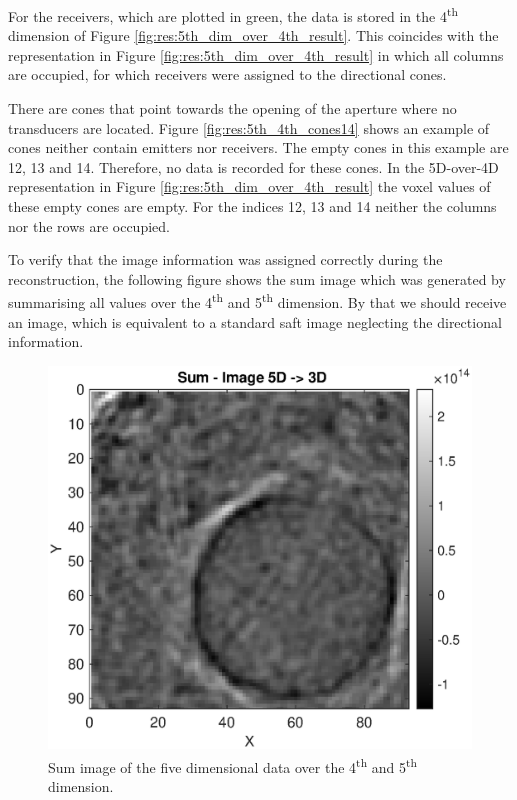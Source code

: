 For the receivers, which are plotted in green, the data is stored in the 4\textsuperscript{th} dimension of Figure \ref{fig:res:5th_dim_over_4th_result}. This coincides with the representation in Figure \ref{fig:res:5th_dim_over_4th_result} in which all columns are occupied, for which receivers were assigned to the directional cones. 

There are cones that point towards the opening of the aperture where no transducers are located. Figure \ref{fig:res:5th_4th_cones14} shows an example of cones neither contain emitters nor receivers. The empty cones in this example are 12, 13 and 14. Therefore, no data is recorded for these cones. In the 5D-over-4D representation in Figure \ref{fig:res:5th_dim_over_4th_result} the voxel values of these empty cones are empty. For the indices 12, 13 and 14 neither the columns nor the rows are occupied.

\bigskip

To verify that the image information was assigned correctly during the reconstruction, the following figure shows the sum image which was generated by summarising all values over the 4\textsuperscript{th} and 5\textsuperscript{th} dimension. By that we should receive an image, which is equivalent to a standard \ac{saft} image neglecting the directional information.


\begin{figure}[H]
    \centering
    \includegraphics[width=0.69\linewidth]{Graphics/sum_image_35_vec_to_show_that_assign_works.eps}
    \caption{Sum image of the five dimensional data over the 4\textsuperscript{th} and 5\textsuperscript{th} dimension. }
    \label{fig:res:sum_image_35_vec_to_show_that_assign_works}
\end{figure}

